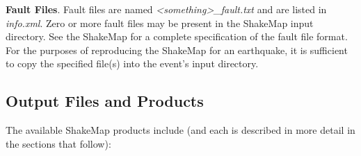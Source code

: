 \documentclass[letterpaper,10pt,english]{sphinxmanual}
\begin{document}
\textbf{Fault Files}. Fault files are named \emph{\textless{}something\textgreater{}\_fault.txt} and are listed in
\emph{info.xml}. Zero or more fault files may be present in the ShakeMap input
directory. See the ShakeMap {\hyperref[software_guide:software\string-guide]{}} for a complete specification
of the fault file format. For the purposes of reproducing the ShakeMap for an
earthquake, it is sufficient to copy the specified file(s) into the event’s
input directory.


\subsection{Output Files and Products}
\label{products:output-files-and-products}
The available ShakeMap products include (and each is described in more detail in the sections
that follow):
\end{document}
